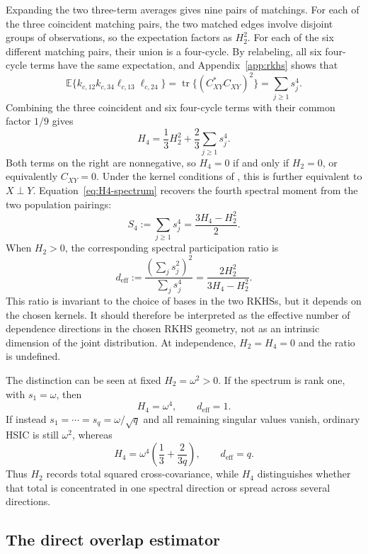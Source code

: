 \documentclass[11pt]{article}
\theoremstyle{plain}
\theoremstyle{definition}
\theoremstyle{remark}
\newcommand{\E}{\mathbb E}
\newcommand{\tr}{\operatorname{tr}}
\begin{document}
Expanding the two three-term averages gives nine pairs of matchings.  For each
of the three coincident matching pairs, the two matched edges involve
disjoint groups of observations, so the expectation factors as $H_2^2$.  For
each of the six different matching pairs, their union is a four-cycle.  By
relabeling, all six four-cycle terms have the same expectation, and
Appendix~\ref{app:rkhs} shows that
\[
 \E\{k_{c,12}k_{c,34}\ell_{c,13}\ell_{c,24}\}
 =\tr\{(C_{XY}^{\ast}C_{XY})^2\}
 =\sum_{j\ge1}s_j^4.
\]
Combining the three coincident and six four-cycle terms with their common
factor $1/9$ gives
\begin{equation}\label{eq:H4-spectrum}
 \boxed{
 H_4=\frac13H_2^2+\frac23\sum_{j\ge1}s_j^4.
 }
\end{equation}
Both terms on the right are nonnegative, so $H_4=0$ if and only if
$H_2=0$, or equivalently $C_{XY}=0$.  Under the kernel conditions of
\citet{SzaboSriperumbudur2018}, this is further equivalent to $X\perp Y$.
Equation~\eqref{eq:H4-spectrum} recovers the fourth spectral moment from the
two population pairings:
\[
 S_4:=\sum_{j\ge1}s_j^4=\frac{3H_4-H_2^2}{2}.
\]
When $H_2>0$, the corresponding spectral participation ratio is
\begin{equation}\label{eq:spectral-participation}
 d_{\mathrm{eff}}
 :=\frac{(\sum_j s_j^2)^2}{\sum_j s_j^4}
 =\frac{2H_2^2}{3H_4-H_2^2}.
\end{equation}
This ratio is invariant to the choice of bases in the two RKHSs, but it
depends on the chosen kernels.  It should therefore be interpreted as the
effective number of dependence directions in the chosen RKHS geometry, not
as an intrinsic dimension of the joint distribution.  At independence,
$H_2=H_4=0$ and the ratio is undefined.

The distinction can be seen at fixed $H_2=\omega^2>0$.  If the spectrum is
rank one, with $s_1=\omega$, then
\[
 H_4=\omega^4,\qquad d_{\mathrm{eff}}=1.
\]
If instead $s_1=\cdots=s_q=\omega/\sqrt q$ and all remaining singular values
vanish, ordinary HSIC is still $\omega^2$, whereas
\[
 H_4=\omega^4\left(\frac13+\frac{2}{3q}\right),
 \qquad d_{\mathrm{eff}}=q.
\]
Thus $H_2$ records total squared cross-covariance, while $H_4$ distinguishes
whether that total is concentrated in one spectral direction or spread
across several directions.



\subsection{The direct overlap estimator}
\end{document}
